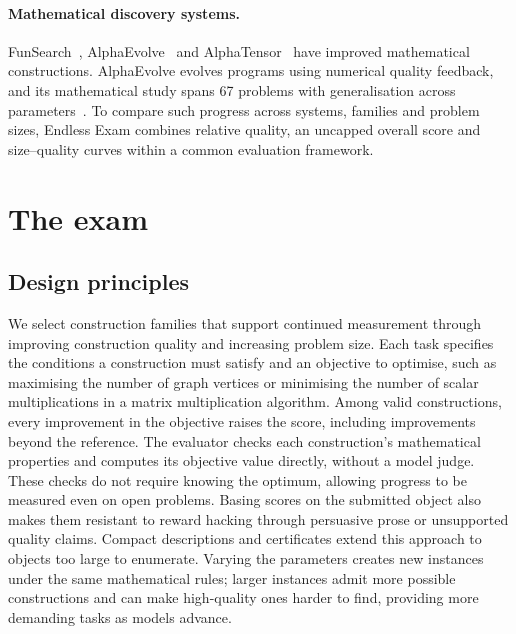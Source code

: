 \documentclass{article}
\begin{document}
\begin{table}[t]
\centering\footnotesize\setlength{\tabcolsep}{2.5pt}
\renewcommand{\arraystretch}{1.06}

\caption{Comparison of mathematical benchmarks and problem collections, using the cited releases. Unsolved indicates inclusion of open research targets. Our 69 instances span 14 families. $^{*}$IMProofBench's main proofs are human-graded; follow-up answers are automatically checked.}
\label{tab:benchmark_comparison}
\end{table}

\paragraph{Mathematical discovery systems.}
FunSearch~\citep{romera2024funsearch}, AlphaEvolve~\citep{novikov2025alphaevolve} and AlphaTensor~\citep{fawzi2022alphatensor} have improved mathematical constructions. AlphaEvolve evolves programs using numerical quality feedback, and its mathematical study spans 67 problems with generalisation across parameters~\citep{georgiev2025exploration}. To compare such progress across systems, families and problem sizes, Endless Exam combines relative quality, an uncapped overall score and size--quality curves within a common evaluation framework.

\section{The exam}
\label{sec:exam}

\subsection{Design principles}
\label{sec:principles}
We select construction families that support continued measurement through improving construction quality and increasing problem size. Each task specifies the conditions a construction must satisfy and an objective to optimise, such as maximising the number of graph vertices or minimising the number of scalar multiplications in a matrix multiplication algorithm. Among valid constructions, every improvement in the objective raises the score, including improvements beyond the reference. The evaluator checks each construction's mathematical properties and computes its objective value directly, without a model judge. These checks do not require knowing the optimum, allowing progress to be measured even on open problems. Basing scores on the submitted object also makes them resistant to reward hacking through persuasive prose or unsupported quality claims. Compact descriptions and certificates extend this approach to objects too large to enumerate. Varying the parameters creates new instances under the same mathematical rules; larger instances admit more possible constructions and can make high-quality ones harder to find, providing more demanding tasks as models advance.
\end{document}
